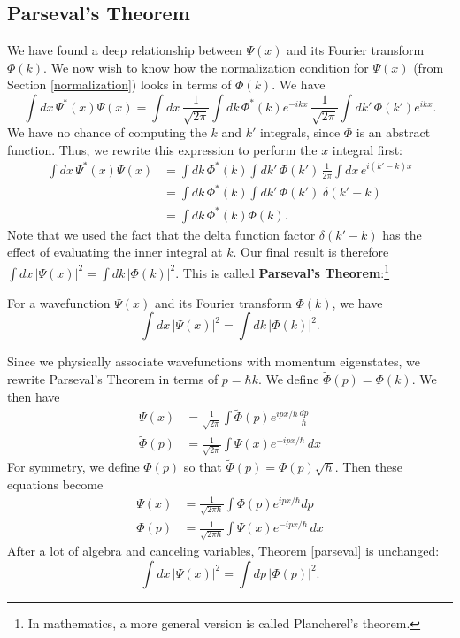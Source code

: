 \subsection{Parseval's Theorem}\label{section-parseval}

We have found a deep relationship between $\Psi(x)$ and its Fourier transform $\Phi(k)$. We now wish to know how the normalization condition for $\Psi(x)$ (from Section \ref{normalization}) looks in terms of $\Phi(k)$. We have $$\int dx\,\Psi^*(x)\Psi(x)=\int dx\,\frac{1}{\sqrt{2\pi}}\int dk\,\Phi^*(k)e^{-ikx}\,\frac{1}{\sqrt{2\pi}}\int dk'\,\Phi(k')e^{ikx}.$$We have no chance of computing the $k$ and $k'$ integrals, since $\Phi$ is an abstract function. Thus, we rewrite this expression to perform the $x$ integral first: \begin{align*}\int dx\,\Psi^*(x)\Psi(x)&=\int dk\,\Phi^*(k)\int dk'\,\Phi(k')\,\frac{1}{2\pi}\int dx\,e^{i(k'-k)x}\\&=\int dk\,\Phi^*(k)\int dk'\,\Phi(k')\;\delta(k'-k)\\&=\int dk\,\Phi^*(k)\Phi(k).\end{align*}Note that we used the fact that the delta function factor $\delta(k'-k)$ has the effect of evaluating the inner integral at $k$. Our final result is therefore $\int dx\,|\Psi(x)|^2=\int dk\,|\Phi(k)|^2$. This is called \textbf{Parseval's Theorem}:\footnote{In mathematics, a more general version is called Plancherel's theorem.}

\begin{framedthm}\label{parseval}
   For a wavefunction $\Psi(x)$ and its Fourier transform $\Phi(k)$, we have $$\int dx\,|\Psi(x)|^2=\int dk\,|\Phi(k)|^2.$$ 
\end{framedthm}

Since we physically associate wavefunctions with momentum eigenstates, we rewrite Parseval's Theorem in terms of $p=\hbar k$. We define $\tilde{\Phi}(p)=\Phi(k)$. We then have \begin{align*}\Psi(x)&=\frac{1}{\sqrt{2\pi}}\int \tilde{\Phi}(p)e^{ipx/\hbar}\frac{dp}{\hbar}\\ \tilde{\Phi}(p)&=\frac{1}{\sqrt{2\pi}}\int\Psi(x)e^{-ipx/\hbar}\,dx\end{align*}For symmetry, we define $\Phi(p)$ so that $\tilde{\Phi}(p)=\Phi(p)\sqrt{\hbar}$. Then these equations become \begin{align*}\Psi(x)&=\frac{1}{\sqrt{2\pi\hbar}}\int {\Phi}(p)e^{ipx/\hbar}dp\\ {\Phi}(p)&=\frac{1}{\sqrt{2\pi\hbar}}\int\Psi(x)e^{-ipx/\hbar}\,dx\end{align*}After a lot of algebra and canceling variables, Theorem \ref{parseval} is unchanged: $$\int dx\,|\Psi(x)|^2=\int dp\,|\Phi(p)|^2.$$

